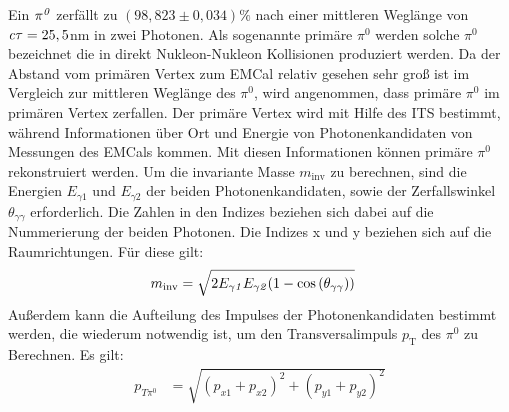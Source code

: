 Ein ${\it \pi^{0}}$ zerf{\"a}llt zu $\left( 98,823\pm0,034\right)\%$ nach einer mittleren Wegl\"ange von ${\it c\tau} = 25,5$nm \cite{book:pdg} in zwei Photonen.
Als sogenannte prim\"are $\pi^{0}$ werden solche $\pi^{0}$ bezeichnet die in direkt Nukleon-Nukleon Kollisionen produziert werden.
Da der Abstand vom prim\"aren Vertex zum EMCal relativ gesehen sehr gro{\ss} ist im Vergleich zur mittleren Wegl\"ange des $\pi^{0}$, wird angenommen, dass prim\"are $\pi^{0}$ im prim\"aren Vertex zerfallen.
Der prim\"are Vertex wird mit Hilfe des ITS bestimmt, w\"ahrend Informationen \"uber Ort und Energie von Photonenkandidaten von Messungen des EMCals kommen. 
Mit diesen Informationen k{\"o}nnen prim\"are ${\pi^{0}}$ rekonstruiert werden.
\newline 
Um die invariante Masse $m_{\text{inv}}$ zu berechnen, sind die Energien $E_{\gamma1}$ und $E_{\gamma2}$ der beiden Photonenkandidaten, sowie der Zerfallswinkel $\theta_{\gamma\gamma}$ erforderlich.
\newline
Die Zahlen in den Indizes beziehen sich dabei auf die Nummerierung der beiden Photonen. Die Indizes x und y beziehen sich auf die Raumrichtungen. F{\"u}r diese gilt:
\begin{align}
m_{\text{inv}} &= \sqrt{2E_{\gamma\it{1}}E_{\gamma\it{2}}(1-\cos\left( \theta_{\gamma\gamma}\right) )} \label{eq_invmass}
\end{align}
Au{\ss}erdem kann die Aufteilung des Impulses der Photonenkandidaten bestimmt werden, die wiederum notwendig ist, um den Transversalimpuls $p_\text{T}$ des $\pi^{0}$ zu Berechnen. Es gilt:
\begin{align}
p_{T\pi^{0}} &= \sqrt{\left(p_{x1}+p_{x2}\right)^{2} +\left(p_{y1}+p_{y2}\right)^{2}} \label{eq_pt}
\end{align}
